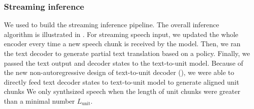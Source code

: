 \subsubsection{Streaming inference}
\label{sec:streaming.inference}
We used \simuleval \citep{ma_simuleval_2020} to build the streaming inference pipeline.
The overall inference algorithm is illustrated in .
For streaming speech input, we updated the whole encoder every time a new speech chunk is received by the model.
Then, we ran the text decoder to generate partial text translation based on a policy.
Finally, we passed the text output and decoder states to the text-to-unit model.
Because of the new non-autoregressive design of \unitytwo text-to-unit decoder (),
we were able to directly feed text decoder states to text-to-unit model to generate aligned unit chunks
We only synthsized speech when the length of unit chunks were greater than a minimal number $L_{\text{unit}}$.
\algnewcommand{}
\algnewcommand{}
\algnewcommand\Input{\item[\algorithmicinput]}%
\algnewcommand\Output{\item[\algorithmicoutput]}%
